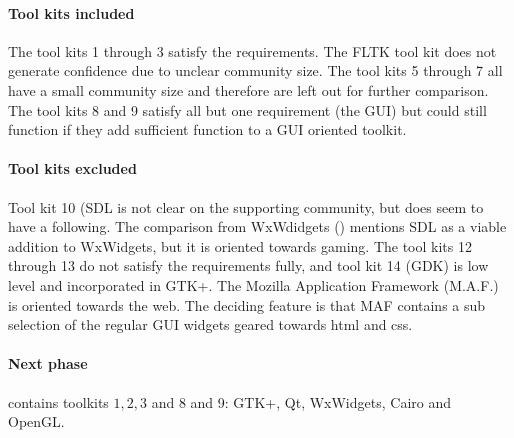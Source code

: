 \paragraph{Tool kits included} The tool kits 1 through 3 satisfy the requirements. 
The {\sf FLTK} tool kit does not generate confidence due to unclear community size. 
The tool kits 5 through 7 all have a small community size and therefore are left out for further comparison. 
The tool kits 8 and 9 satisfy all but one requirement (the GUI) but could still function if they 
add sufficient function to a GUI oriented toolkit. 

\paragraph{Tool kits excluded}
Tool kit 10 ({\sf SDL} is not clear on the supporting community, but does seem to have a following. 
The comparison from WxWdidgets (\cite{wxwidget:comparison}) mentions {\sf SDL} as a viable addition 
to WxWidgets, but it is oriented towards gaming. The tool kits 12 through 13 do not satisfy the 
requirements fully, and tool kit 14 (GDK) is low level and incorporated in {\sf GTK+}. 
The Mozilla Application Framework ({\sf M.A.F.}) is oriented towards the web. The deciding feature 
is that {\sf MAF} contains a sub selection of the regular GUI widgets geared towards html and css.

\paragraph{Next phase}
contains toolkits $1, 2, 3$ and 8 and 9: {\sf GTK+, Qt, WxWidgets, Cairo and OpenGL}. 
